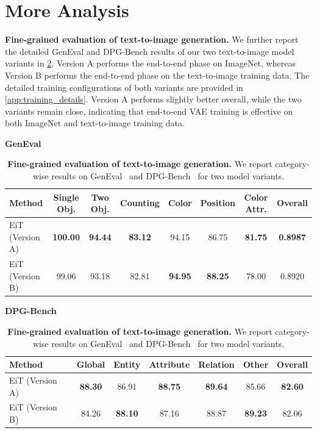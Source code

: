 
\section{More Analysis}

\textbf{Fine-grained evaluation of text-to-image generation.}
We further report the detailed GenEval and DPG-Bench results of our two text-to-image model variants in \cref{tab:t2i_eval_details}.
Version A performs the end-to-end phase on ImageNet, whereas Version B performs the end-to-end phase on the text-to-image training data.
The detailed training configurations of both variants are provided in \cref{app:training_details}.
Version A performs slightly better overall, while the two variants remain close, indicating that end-to-end VAE training is effective on both ImageNet and text-to-image training data.


\begin{table}[]
\centering
\scriptsize
\caption{
\textbf{Fine-grained evaluation of text-to-image generation.}
We report category-wise results on GenEval~\cite{geneval} and DPG-Bench~\cite{dpg} for two model variants.
}
\label{tab:t2i_eval_details}
\setlength{\tabcolsep}{4.0pt}

\begin{minipage}{\linewidth}
\centering
\textbf{GenEval}\\[2pt]
\begin{tabular}{lccccccc}
\toprule
Method
& Single Obj.
& Two Obj.
& Counting
& Color
& Position
& Color Attr.
& Overall \\
\midrule
EiT (Version A)
& \textbf{100.00}
& \textbf{94.44}
& \textbf{83.12}
& 94.15
& 86.75
& \textbf{81.75}
& \textbf{0.8987} \\
EiT (Version B)
& 99.06
& 93.18
& 82.81
& \textbf{94.95}
& \textbf{88.25}
& 78.00
& 0.8920 \\
\bottomrule
\end{tabular}
\end{minipage}

\vspace{5pt}

\begin{minipage}{\linewidth}
\centering
\textbf{DPG-Bench}\\[2pt]
\begin{tabular}{lcccccc}
\toprule
Method
& Global
& Entity
& Attribute
& Relation
& Other 
& Overall \\
\midrule
EiT (Version A)
& \textbf{88.30}
& 86.91
& \textbf{88.75}
& \textbf{89.64}
& 85.66 
& \textbf{82.60}\\
EiT (Version B)
& 84.26
& \textbf{88.10}
& 87.16
& 88.87
& \textbf{89.23} 
& 82.06\\
\bottomrule
\end{tabular}
\end{minipage}

\end{table}

